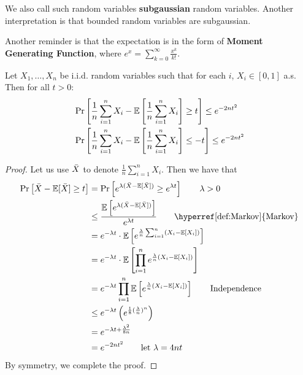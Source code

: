 \begin{remark}
    We also call such random variables \textbf{subgaussian} random variables. Another interpretation
    is that bounded random variables are subgaussian. 

    Another reminder is that the expectation is in the form of \textbf{Moment Generating Function}, 
    where \(e^x = \sum_{k=0}^\infty \frac{x^k}{k!}\). 
\end{remark}

\begin{theorem}\label{def:hoeffding_ineq}
    Let \(X_1, \ldots, X_n\) be i.i.d. random variables such that for each \(i\), \(X_i \in [0,1]\)
    a.s. Then for all \(t > 0\): 
    \begin{align*}
        &\Pr \left[  \frac{1}{n}\sum_{i=1}^n X_i - \mathbb{E} \left[ \frac{1}{n}\sum_{i=1}^n X_i \right] \geq t \right] \leq e^{-2nt^2} \\
        &\Pr \left[  \frac{1}{n}\sum_{i=1}^n X_i - \mathbb{E} \left[ \frac{1}{n}\sum_{i=1}^n X_i \right] \leq -t \right] \leq e^{-2nt^2}  
    \end{align*}
\end{theorem}

\begin{proof}
    Let us use \(\bar{X}\) to denote \(\frac{1}{n}\sum_{i=1}^n X_i\). Then we have that 
    \begin{align*}
        \Pr \midBrac{ \Xbar - \expec[\Xbar] \geq t} 
        &= \Pr \midBrac{e^{\lambda(\Xbar - \expec[\Xbar] )} \geq e^{\lambda t}} \tag*{\(\lambda > 0\)} \\ 
        &\leq \frac{\expec \midBrac{e^{\lambda(\Xbar - \expec[\Xbar] )}}}{e^{\lambda t}} \tag*{\hyperref[def:Markov]{Markov}}  \\
        &= e^{-\lambda t} \cdot \expec \midBrac{e^{ \frac{\lambda}{n} \sum_{i=1}^n \left(X_i - \expec [X_i]\right) }} \\ 
        &= e^{-\lambda t} \cdot \expec \midBrac{\prod_{i=1}^n e^{\frac{\lambda}{n} \left(X_i - \expec[X_i]\right)}} \\ 
        &= e^{-\lambda t} \prod_{i=1}^n \expec \midBrac{e^{\frac{\lambda}{n} \left(X_i - \expec[X_i]\right)}} \tag*{Independence} \\ 
        &\leq e^{-\lambda t} \left(e^{\frac{1}{8} (\frac{\lambda}{n})^n}\right) \\ 
        &= e^{-\lambda t + \frac{\lambda^2}{8n}}  \\ 
        &= e^{-2nt^2} \tag*{let \(\lambda = 4nt\)}
    \end{align*}
    By symmetry, we complete the proof. 
\end{proof}

